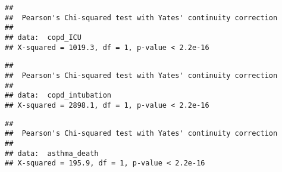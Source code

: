 \documentclass[
]{article}
\newenvironment{Shaded}{\begin{snugshade}}{\end{snugshade}}
\newcommand{\CommentTok}[1]{\textcolor[rgb]{0.56,0.35,0.01}{\textit{#1}}}
\newcommand{\FunctionTok}[1]{\textcolor[rgb]{0.00,0.00,0.00}{#1}}
\newcommand{\NormalTok}[1]{#1}
\newcommand{\OtherTok}[1]{\textcolor[rgb]{0.56,0.35,0.01}{#1}}
\newcommand{\SpecialCharTok}[1]{\textcolor[rgb]{0.00,0.00,0.00}{#1}}
\begin{document}
\begin{Shaded}
\end{Shaded}

\begin{verbatim}
## 
##  Pearson's Chi-squared test with Yates' continuity correction
## 
## data:  copd_ICU
## X-squared = 1019.3, df = 1, p-value < 2.2e-16
\end{verbatim}

\begin{Shaded}
\end{Shaded}

\begin{verbatim}
## 
##  Pearson's Chi-squared test with Yates' continuity correction
## 
## data:  copd_intubation
## X-squared = 2898.1, df = 1, p-value < 2.2e-16
\end{verbatim}

\begin{Shaded}
\end{Shaded}

\begin{verbatim}
## 
##  Pearson's Chi-squared test with Yates' continuity correction
## 
## data:  asthma_death
## X-squared = 195.9, df = 1, p-value < 2.2e-16
\end{verbatim}
\end{document}
